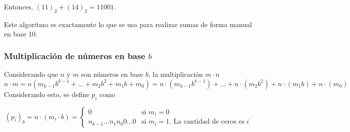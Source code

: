 \documentclass[../main.tex]{subfiles}
\begin{document}
Entonces, $(11)_2 + (14)_2 = 11001$.

Este algoritmo es exactamente lo que se usa para realizar sumas de forma manual en base $10$.

\subsubsection[Multiplicación de números en base b]{Multiplicación de números en base $b$}
Considerando que $n$ y $m$ son números en base $b$, la multiplicación $m \cdot n$
\[ n \cdot m = n(m_{k-1} b^{k-1} + \ldots + m_2 b^2 + m_1 b + m_0) = n \cdot (m_{k-1} b^{k-1}) + \ldots + n \cdot (m_2 b^2) + n \cdot (m_1 b) + n \cdot (m_0) \]
Considerando esto, se define $p_i$ como

\begin{equation*}
    (p_i)_b = n \cdot (m_i \cdot b) =
        \begin{cases}
            0 & \text{si } m_i = 0\\
            n_{k-1} \ldots n_1 n_0 0 \ldots 0 & \text{si } m_i = 1 \text{. La cantidad de ceros es } i
        \end{cases}
\end{equation*}
\end{document}
